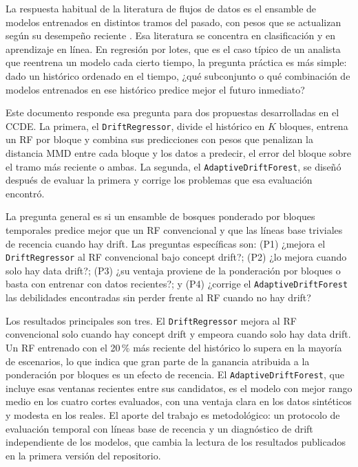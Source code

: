 \documentclass[11pt,a4paper]{article}
\begin{document}
La respuesta habitual de la literatura de flujos de datos es el ensamble de modelos entrenados en
distintos tramos del pasado, con pesos que se actualizan según su desempeño reciente
\parencite{kolter2007,elwell2011,gomes2017}. Esa literatura se concentra en clasificación y en
aprendizaje en línea. En regresión por lotes, que es el caso típico de un analista que reentrena un
modelo cada cierto tiempo, la pregunta práctica es más simple: dado un histórico ordenado en el
tiempo, ¿qué subconjunto o qué combinación de modelos entrenados en ese histórico predice mejor el
futuro inmediato?

Este documento responde esa pregunta para dos propuestas desarrolladas en el CCDE. La primera, el
\texttt{DriftRegressor}, divide el histórico en $K$ bloques, entrena un RF por bloque y combina sus
predicciones con pesos que penalizan la distancia MMD \parencite{gretton2012} entre cada bloque y los
datos a predecir, el error del bloque sobre el tramo más reciente o ambas. La segunda, el
\texttt{AdaptiveDriftForest}, se diseñó después de evaluar la primera y corrige los problemas que esa
evaluación encontró.

La pregunta general es si un ensamble de bosques ponderado por bloques temporales predice mejor que
un RF convencional y que las líneas base triviales de recencia cuando hay drift. Las preguntas
específicas son: (P1) ¿mejora el \texttt{DriftRegressor} al RF convencional bajo concept drift?; (P2)
¿lo mejora cuando solo hay data drift?; (P3) ¿su ventaja proviene de la ponderación por bloques o
basta con entrenar con datos recientes?; y (P4) ¿corrige el \texttt{AdaptiveDriftForest} las
debilidades encontradas sin perder frente al RF cuando no hay drift?

Los resultados principales son tres. El \texttt{DriftRegressor} mejora al RF convencional solo cuando
hay concept drift y empeora cuando solo hay data drift. Un RF entrenado con el 20\,\% más reciente del
histórico lo supera en la mayoría de escenarios, lo que indica que gran parte de la ganancia atribuida
a la ponderación por bloques es un efecto de recencia. El \texttt{AdaptiveDriftForest}, que incluye
esas ventanas recientes entre sus candidatos, es el modelo con mejor rango medio en los cuatro cortes
evaluados, con una ventaja clara en los datos sintéticos y modesta en los reales. El aporte del
trabajo es metodológico: un protocolo de evaluación temporal con líneas base de recencia y un
diagnóstico de drift independiente de los modelos, que cambia la lectura de los resultados
publicados en la primera versión del repositorio.
\end{document}
